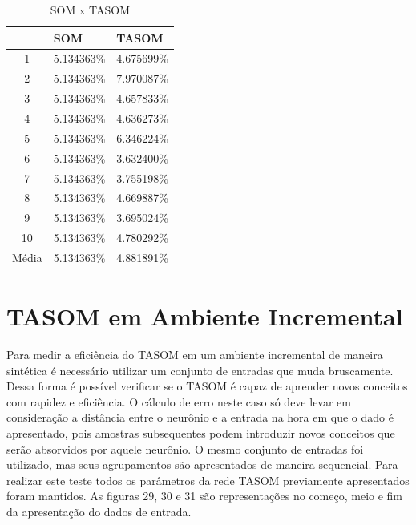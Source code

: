 \begin{table}[h]
\centering
\caption{SOM x TASOM}
\label{comp}
\begin{tabular}{c|l|l|}
\cline{2-3}
                            & SOM      & TASOM    \\ \hline
\multicolumn{1}{|c|}{1}     & 5.134363\% & 4.675699\% \\ \hline
\multicolumn{1}{|c|}{2}     & 5.134363\% & 7.970087\% \\ \hline
\multicolumn{1}{|c|}{3}     & 5.134363\% & 4.657833\% \\ \hline
\multicolumn{1}{|c|}{4}     & 5.134363\% & 4.636273\% \\ \hline
\multicolumn{1}{|c|}{5}     & 5.134363\% & 6.346224\% \\ \hline
\multicolumn{1}{|c|}{6}     & 5.134363\% & 3.632400\% \\ \hline
\multicolumn{1}{|c|}{7}     & 5.134363\% & 3.755198\% \\ \hline
\multicolumn{1}{|c|}{8}     & 5.134363\% & 4.669887\% \\ \hline
\multicolumn{1}{|c|}{9}     & 5.134363\% & 3.695024\% \\ \hline
\multicolumn{1}{|c|}{10}    & 5.134363\% & 4.780292\% \\ \hline
\multicolumn{1}{|l|}{Média} & 5.134363\% & 4.881891\% \\ \hline
\end{tabular}
\end{table}

\section{TASOM em Ambiente Incremental}
Para medir a eficiência do TASOM em um ambiente incremental de maneira sintética é necessário utilizar um conjunto de entradas que muda bruscamente. Dessa forma é possível verificar se o TASOM é capaz de aprender novos conceitos com rapidez e eficiência. O cálculo de erro neste caso só deve levar em consideração a distância entre o neurônio e a entrada na hora em que o dado é apresentado, pois amostras subsequentes podem introduzir novos conceitos que serão absorvidos por aquele neurônio. O mesmo conjunto de entradas foi utilizado, mas seus agrupamentos são apresentados de maneira sequencial. Para realizar este teste todos os parâmetros da rede TASOM previamente apresentados foram mantidos. As figuras 29, 30 e 31 são representações no começo, meio e fim da apresentação do dados de entrada.

